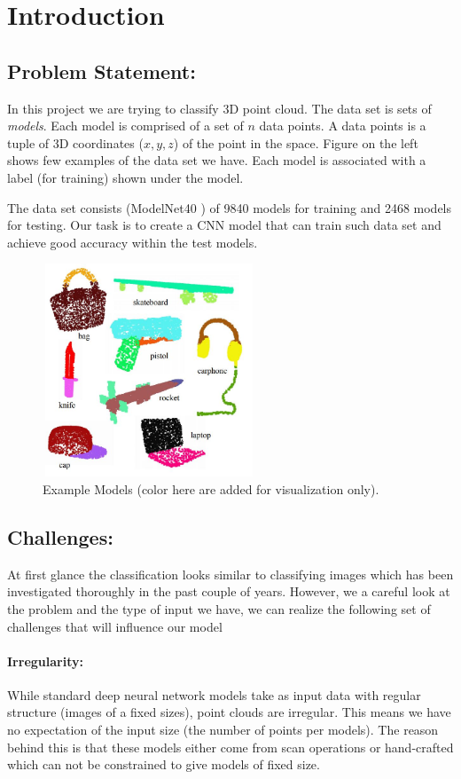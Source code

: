 \section{Introduction} 
\subsection{Problem Statement:}

In this project we are trying to classify 3D point cloud. The data set is sets of \emph{models}. Each model is comprised of a set of $n$ data points. A data points is a tuple of 3D coordinates ($x,y,z$) of the point in the space. Figure on the left shows few examples of the data set we have. Each model is associated with a label (for training) shown under the model. 


The data set consists (ModelNet40 \citep{wu20153d}) of 9840 models for training and 2468 models for testing. Our task is to create a CNN model that can train such data set and achieve good accuracy within the test models. 

\begin{figure}[hbt]
\includegraphics[height=2.5in, width=2.5in]{fig/ex.JPG}
\caption{Example Models (color here are added for visualization only).}
\end{figure}


\subsection{Challenges:}
At first glance the classification looks similar to classifying images which has been investigated thoroughly in the past couple of years. However, we a careful look at the problem and the type of input we have, we can realize the following set of challenges that will influence our model
\paragraph{Irregularity:}
While standard deep neural network models take as input data with regular structure (images of a fixed sizes), point clouds are irregular. This means we have no expectation of the input size (the number of points per models). The reason behind this is that these models either come from scan operations or hand-crafted which can not be constrained to give models of fixed size.

